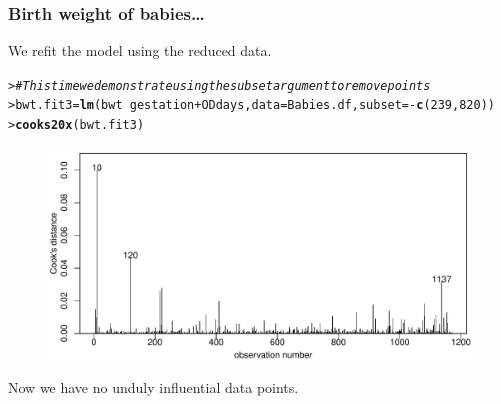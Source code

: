 \documentclass{beamer}\usepackage[]{graphicx}\usepackage[]{xcolor}
\makeatletter
\newcommand{\hlnum}[1]{\textcolor[rgb]{0.686,0.059,0.569}{#1}}%
\newcommand{\hlcom}[1]{\textcolor[rgb]{0.678,0.584,0.686}{\textit{#1}}}%
\newcommand{\hlopt}[1]{\textcolor[rgb]{0,0,0}{#1}}%
\newcommand{\hlstd}[1]{\textcolor[rgb]{0.345,0.345,0.345}{#1}}%
\newcommand{\hlkwb}[1]{\textcolor[rgb]{0.69,0.353,0.396}{#1}}%
\newcommand{\hlkwc}[1]{\textcolor[rgb]{0.333,0.667,0.333}{#1}}%
\newcommand{\hlkwd}[1]{\textcolor[rgb]{0.737,0.353,0.396}{\textbf{#1}}}%
\newenvironment{kframe}{%
 \def\at@end@of@kframe{}%
 \ifinner\ifhmode%
  \def\at@end@of@kframe{\end{minipage}}%
  \begin{minipage}{\columnwidth}%
 \fi\fi%
 \def\FrameCommand##1{\hskip\@totalleftmargin \hskip-\fboxsep
 \colorbox{shadecolor}{##1}\hskip-\fboxsep
     \hskip-\linewidth \hskip-\@totalleftmargin \hskip\columnwidth}%
 \MakeFramed {\advance\hsize-\width
   \@totalleftmargin\z@ \linewidth\hsize
   \@setminipage}}%
 {\par\unskip\endMakeFramed%
 \at@end@of@kframe}
\newenvironment{knitrout}{}{} %
\makeatother
\begin{document}
\begin{frame}[fragile]
\frametitle{Birth weight of babies\ldots}
We refit the model using the reduced data.

\begin{knitrout}\scriptsize
{}\color{fgcolor}\begin{kframe}
\begin{alltt}
\hlstd{> }\hlcom{#This time we demonstrate using the subset argument to remove points}
\hlstd{> }\hlstd{bwt.fit3}\hlkwb{=}\hlkwd{lm}\hlstd{(bwt}\hlopt{~} \hlstd{gestation}\hlopt{+}\hlstd{ODdays,}\hlkwc{data} \hlstd{= Babies.df,} \hlkwc{subset} \hlstd{=} \hlopt{-}\hlkwd{c}\hlstd{(}\hlnum{239}\hlstd{,} \hlnum{820}\hlstd{))}
\hlstd{> }\hlkwd{cooks20x}\hlstd{(bwt.fit3)}
\end{alltt}
\end{kframe}
\end{knitrout}



\begin{figure}
  \centering
  \includegraphics[scale = 0.5]{figure/RC-H10-028}
\end{figure}

Now we have no unduly influential data points.
\end{frame}
\end{document}
